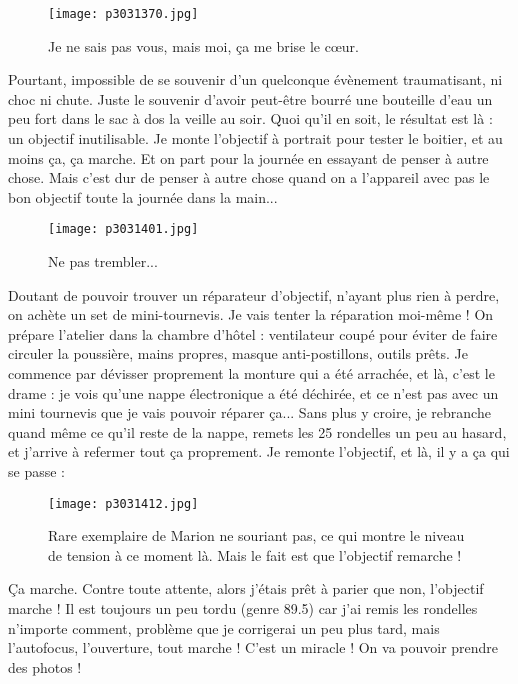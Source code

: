\documentclass{book}
\begin{document}
\begin{figure}[h]
\centering
\texttt{[image: p3031370.jpg]}
\caption*{Je ne sais pas vous, mais moi, ça me brise le cœur.}
\end{figure}

Pourtant, impossible de se souvenir d'un quelconque évènement traumatisant, ni choc ni chute. Juste le souvenir d'avoir peut-être bourré une bouteille d'eau un peu fort dans le sac à dos la veille au soir. Quoi qu'il en soit, le résultat est là : un objectif inutilisable. Je monte l'objectif à portrait pour tester le boitier, et au moins ça, ça marche. Et on part pour la journée en essayant de penser à autre chose. Mais c'est dur de penser à autre chose quand on a l'appareil avec pas le bon objectif toute la journée dans la main...


\begin{figure}[h]
\centering
\texttt{[image: p3031401.jpg]}
\caption*{Ne pas trembler...}
\end{figure}

Doutant de pouvoir trouver un réparateur d'objectif, n'ayant plus rien à perdre, on achète un set de mini-tournevis. Je vais tenter la réparation moi-même ! On prépare l'atelier dans la chambre d’hôtel : ventilateur coupé pour éviter de faire circuler la poussière, mains propres, masque anti-postillons, outils prêts. Je commence par dévisser proprement la monture qui a été arrachée, et là, c'est le drame : je vois qu'une nappe électronique a été déchirée, et ce n'est pas avec un mini tournevis que je vais pouvoir réparer ça... Sans plus y croire, je rebranche quand même ce qu'il reste de la nappe, remets les 25 rondelles un peu au hasard, et j'arrive à refermer tout ça proprement. Je remonte l'objectif, et là, il y a ça qui se passe :


\begin{figure}[h]
\centering
\texttt{[image: p3031412.jpg]}
\caption*{Rare exemplaire de Marion ne souriant pas, ce qui montre le niveau de tension à ce moment là. Mais le fait est que l'objectif remarche !}
\end{figure}

Ça marche. Contre toute attente, alors j'étais prêt à parier que non, l'objectif marche ! Il est toujours un peu tordu (genre 89.5\textdegree ) car j'ai remis les rondelles n'importe comment, problème que je corrigerai un peu plus tard, mais l'autofocus, l'ouverture, tout marche ! C'est un miracle ! On va pouvoir prendre des photos !
\end{document}
